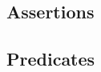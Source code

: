 \documentclass[12pt,titlepage]{article}
\begin{document}
\newpage
\subsection{Assertions}\label{sec:mod1}
\begin{figure}[h]
\end{figure}
\clearpage

\newpage
\subsection{Predicates}\label{sec:mod1}
\begin{figure}[h]
\end{figure}
\end{document}
